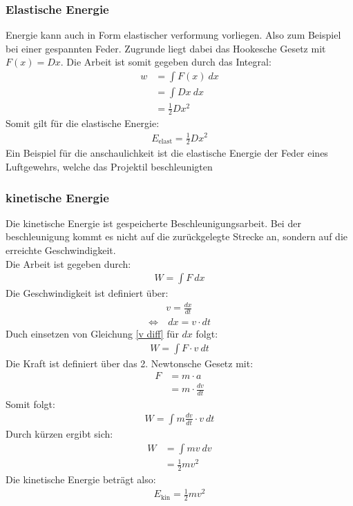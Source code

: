 \documentclass{article}
\begin{document}
\subsubsection{Elastische Energie}
Energie kann auch in Form elastischer verformung vorliegen. Also zum Beispiel bei einer gespannten Feder. 
Zugrunde liegt dabei das Hookesche Gesetz mit $F(x)=Dx$. Die Arbeit ist somit gegeben durch das Integral:
\begin{align}
    w&=\int F(x)\ dx \\
    &=\int Dx\ dx\\
    &=\frac{1}{2}Dx^2
\end{align}
Somit gilt für die elastische Energie:
\begin{align}
    E_\mathrm{elast}=\frac{1}{2}Dx^2
\end{align}
Ein Beispiel für die anschaulichkeit ist die elastische Energie der Feder eines Luftgewehrs, welche das Projektil beschleunigten

\subsubsection{kinetische Energie}
Die kinetische Energie ist gespeicherte Beschleunigungsarbeit. Bei der beschleunigung kommt es nicht auf die zurückgelegte Strecke an,
sondern auf die erreichte Geschwindigkeit.\\
Die Arbeit ist gegeben durch:
\begin{align}
    W=\int F\ dx
\end{align}
Die Geschwindigkeit ist definiert über:
\begin{align}
    &v=\frac{dx}{dt} \\
    \Longleftrightarrow&\ dx=v\cdot dt    \label{v diff}
\end{align}
Duch einsetzen von Gleichung \ref{v diff} für $dx$ folgt:
\begin{align}
    W=\int F\cdot v\ dt
\end{align}
Die Kraft ist definiert über das 2. Newtonsche Gesetz mit:
\begin{align}
    F&=m\cdot a\\
    &=m\cdot \frac{dv}{dt}
\end{align}
Somit folgt:
\begin{align}
    W=\int m\frac{dv}{dt}\cdot v\ dt
\end{align}
Durch kürzen ergibt sich:
\begin{align}
    W&=\int mv\ dv\\
    &=\frac{1}{2}mv^2
\end{align}
Die kinetische Energie beträgt also:
\begin{align}
    E_\mathrm{kin}=\frac{1}{2}mv^2
\end{align}
\end{document}
